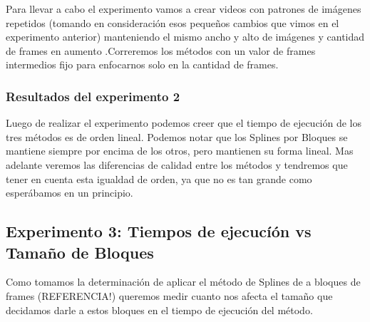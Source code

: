 \par Para llevar a cabo el experimento vamos a crear videos con patrones de im\'agenes repetidos (tomando en consideraci\'on esos pequeños cambios que vimos en el experimento anterior) manteniendo el mismo ancho y alto de im\'agenes y cantidad de frames en aumento .Correremos los m\'etodos con un valor de frames intermedios fijo para enfocarnos solo en la cantidad de frames.


\subsubsection{Resultados del experimento 2}
\begin{figure}[ht]
	\begin{center}
	\end{center}
\end{figure}
\par Luego de realizar el experimento podemos creer que el tiempo de ejecuci\'on de los tres m\'etodos es de orden lineal. Podemos notar que los Splines por Bloques se mantiene siempre por encima de los otros, pero mantienen su forma lineal. Mas adelante veremos las diferencias de calidad entre los m\'etodos y tendremos que tener en cuenta esta igualdad de orden, ya que no es tan grande como esper\'abamos en un principio. 





\subsection{Experimento 3: Tiempos de ejecucí\'on vs Tama\~no de Bloques}
\par Como tomamos la determinación de aplicar el m\'etodo de Splines de a bloques de frames (REFERENCIA!) queremos medir cuanto nos afecta el tama\~no que decidamos darle a estos bloques en el tiempo de ejecuci\'on del m\'etodo.

